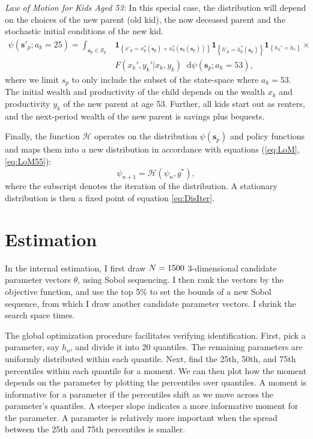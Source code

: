 \documentclass[12pt]{article}
\newcommand*\diff{\mathop{}\!\mathrm{d}}
\begin{document}
\textit{Law of Motion for Kids Aged 53:} In this special case, the distribution will depend on the choices of the new parent (old kid), the now deceased parent and the stochastic initial conditions of the new kid. 
\begin{equation}\label{eq:LoM55}
\begin{split}
\psi(\mathbf{s}'_p;a_k=25)  =  \int_{\mathbf{s}_p\in \mathcal{S}_p} & 
\mathbf{1}_{\left\{ x'_p = x^*_p(\mathbf s_p) + x^*_k(\mathbf s_k(\mathbf s_p)) \right\} }
\mathbf{1}_{\left\{ h'_p = h^*_p(\mathbf s_p) \right\} } 
\mathbf{1}_{\left\{ h_k' = h_r\right\}} \times \\
&F(x_k',y_k'|x_k,y_k)  \diff \psi(\mathbf s_p;a_k=53),
\end{split}
\end{equation}
where we limit $s_p$ to only include the subset of the state-space where $a_k=53$. The initial wealth and productivity of the child depends on the wealth $x_k$ and productivity $y_k$ of the new parent at age 53. Further, all kids start out as renters, and the next-period wealth of the new parent is savings plus bequests.

Finally, the function $\mathcal{H}$ operates on the distribution $\psi(\mathbf{s}_p)$ and policy functions %
and maps them into a new distribution in accordance with equations (\ref{eq:LoM}, \ref{eq:LoM55}):
\begin{equation}\label{eq:DisIter}
\psi_{n+1} = \mathcal{H}(\psi_n,g^*),
\end{equation}
where the subscript denotes the iteration of the distribution. A stationary distribution is then a fixed point of equation \ref{eq:DisIter}.


\section{Estimation}\label{app:SMM}
In the internal estimation, I first draw $N=1500$ 3-dimensional candidate parameter vectors $\theta$, using Sobol sequencing. I then rank the vectors by the objective function, and use the top 5\% to set the bounds of a new Sobol sequence, from which I draw another {\parNest} candidate parameter vectors. I shrink the search space {\parNshrinks} times. 

The global optimization procedure facilitates verifying identification. First, pick a parameter, say $h_o$, and divide it into 20 quantiles. The remaining parameters are uniformly distributed within each quantile. Next, find the 25th, 50th, and 75th percentiles within each quantile for a moment. We can then plot how the moment depends on the parameter by plotting the percentiles over quantiles. A moment is informative for a parameter if the percentiles shift as we move across the parameter's quantiles. A steeper slope indicates a more informative moment for the parameter. A parameter is relatively more important when the spread between the 25th and 75th percentiles is smaller.  
\end{document}
